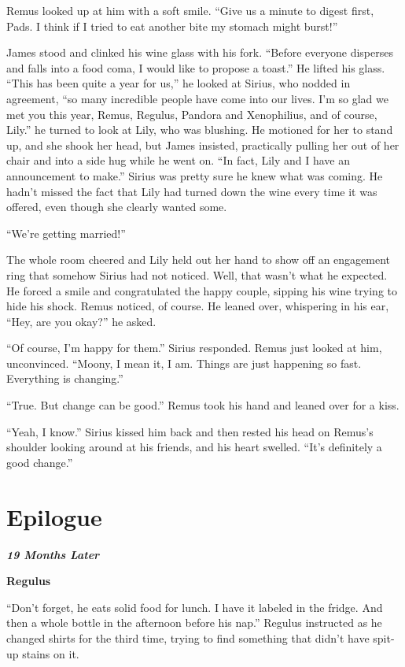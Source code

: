 \documentclass[12pt,twoside,openright]{memoir}
\begin{document}
Remus looked up at him with a soft smile. ``Give us a minute to digest first, Pads. I think if I tried to eat another bite my stomach might burst!''

James stood and clinked his wine glass with his fork. ``Before everyone disperses and falls into a food coma, I would like to propose a toast.'' He lifted his glass. ``This has been quite a year for us,'' he looked at Sirius, who nodded in agreement, ``so many incredible people have come into our lives. I'm so glad we met you this year, Remus, Regulus, Pandora and Xenophilius, and of course, Lily.'' he turned to look at Lily, who was blushing. He motioned for her to stand up, and she shook her head, but James insisted, practically pulling her out of her chair and into a side hug while he went on. ``In fact, Lily and I have an announcement to make.'' Sirius was pretty sure he knew what was coming. He hadn't missed the fact that Lily had turned down the wine every time it was offered, even though she clearly wanted some. 

``We're getting married!'' 

The whole room cheered and Lily held out her hand to show off an engagement ring that somehow Sirius had not noticed. Well, that wasn't what he expected. He forced a smile and congratulated the happy couple, sipping his wine trying to hide his shock. Remus noticed, of course. He leaned over, whispering in his ear, ``Hey, are you okay?'' he asked.

``Of course, I'm happy for them.'' Sirius responded. Remus just looked at him, unconvinced. ``Moony, I mean it, I am. Things are just happening so fast. Everything is changing.'' 

``True. But change can be good.'' Remus took his hand and leaned over for a kiss.

``Yeah, I know.'' Sirius kissed him back and then rested his head on Remus's shoulder looking around at his friends, and his heart swelled. ``It's definitely a good change.''

\chapter{Epilogue}

\textit{\textbf{19 Months Later} }

\textbf{Regulus} 

``Don't forget, he eats solid food for lunch. I have it labeled in the fridge. And then a whole bottle in the afternoon before his nap.'' Regulus instructed as he changed shirts for the third time, trying to find something that didn't have spit-up stains on it. 
\end{document}
